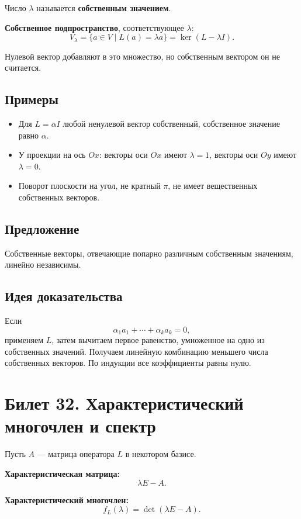 \documentclass[12pt,a4paper]{article}
\DeclareMathOperator{\Ker}{ker}
\begin{document}
Число $\lambda$ называется \textbf{собственным значением}.

\textbf{Собственное подпространство}, соответствующее $\lambda$:
\[
    V_\lambda=\{a\in V\mid L(a)=\lambda a\}=\Ker(L-\lambda I).
\]

Нулевой вектор добавляют в это множество, но собственным вектором он не считается.

\subsection*{Примеры}

\begin{itemize}
    \item Для $L=\alpha I$ любой ненулевой вектор собственный, собственное значение равно $\alpha$.
    \item У проекции на ось $Ox$: векторы оси $Ox$ имеют $\lambda=1$, векторы оси $Oy$ имеют $\lambda=0$.
    \item Поворот плоскости на угол, не кратный $\pi$, не имеет вещественных собственных векторов.
\end{itemize}

\subsection*{Предложение}

Собственные векторы, отвечающие попарно различным собственным значениям, линейно независимы.

\subsection*{Идея доказательства}

Если
\[
    \alpha_1a_1+\cdots+\alpha_ka_k=0,
\]
применяем $L$, затем вычитаем первое равенство, умноженное на одно из собственных значений. Получаем линейную комбинацию меньшего числа собственных векторов. По индукции все коэффициенты равны нулю.

\section{Билет 32. Характеристический многочлен и спектр}

Пусть $A$ --- матрица оператора $L$ в некотором базисе.

\textbf{Характеристическая матрица:}
\[
    \lambda E-A.
\]

\textbf{Характеристический многочлен:}
\[
    f_L(\lambda)=\det(\lambda E-A).
\]
\end{document}
